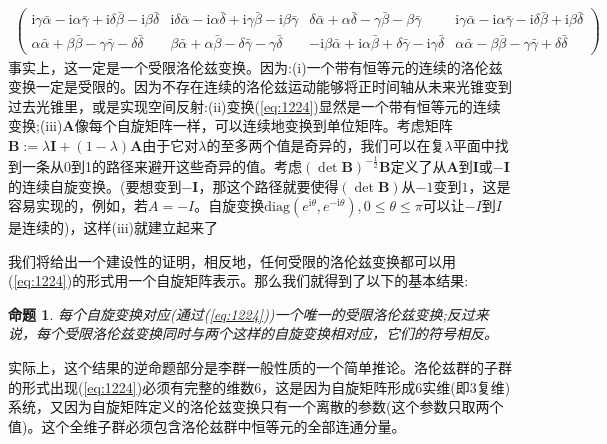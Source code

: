 \documentclass[utf8]{ctexbook}
\numberwithin{equation}{section}
\newtheorem{proposition}{命题}[chapter]
\begin{document}
\begin{gather}
{{\begin{pmatrix}
            \mathrm{i} \gamma  \bar{\alpha }-\mathrm{i} \alpha  \bar{\gamma }+\mathrm{i} \delta  \bar{\beta }-\mathrm{i} \beta \bar{\delta }& \mathrm{i} \delta  \bar{\alpha }-\mathrm{i} \alpha  \bar{\delta }+\mathrm{i} \gamma  \bar{\beta }-\mathrm{i} \beta  \bar{\gamma }&\delta  \bar{\alpha }+\alpha  \bar{\delta }-\gamma  \bar{\beta }-\beta  \bar{\gamma }& \mathrm{i} \gamma  \bar{\alpha }-\mathrm{i}\alpha  \bar{\gamma }-\mathrm{i} \delta  \bar{\beta }+\mathrm{i} \beta  \bar{\delta }\\ 
            \alpha  \bar{\alpha }+\beta  \bar{\beta }-\gamma \bar{\gamma }-\delta  \bar{\delta }& \beta  \bar{\alpha }+\alpha  \bar{\beta }-\delta  \bar{\gamma }-\gamma  \bar{\delta}& -\mathrm{i} \beta  \bar{\alpha }+\mathrm{i} \alpha  \bar{\beta }+ \delta  \bar{\gamma }-\mathrm{i} \gamma  \bar{\delta }& \alpha \bar{\alpha }-\beta  \bar{\beta }-\gamma  \bar{\gamma }+\delta  \bar{\delta }
        \end{pmatrix}}}\label{eq:1226}
\end{gather}
事实上，这一定是一个受限洛伦兹变换。因为:(i)一个带有恒等元的连续的洛伦兹变换一定是受限的。因为不存在连续的洛伦兹运动能够将正时间轴从未来光锥变到过去光锥里，或是实现空间反射:(ii)变换(\ref{eq:1224})显然是一个带有恒等元的连续变换;(iii)$\mathbf{A}$像每个自旋矩阵一样，可以连续地变换到单位矩阵。考虑矩阵$\mathbf{B}:=\lambda \mathbf{I}+(1- \lambda)\mathbf{A}$由于它对$\lambda$的至多两个值是奇异的，我们可以在复$\lambda$平面中找到一条从0到1的路径来避开这些奇异的值。考虑$(\det \mathbf{B})^{-\frac12}\mathbf{B}$定义了从$\mathbf{A}$到$\mathbf{I}$或$-\mathbf{I}$的连续自旋变换。(要想变到$-\mathbf{I}$，那这个路径就要使得$(\det \mathbf{B})$从$-1$变到$1$，这是容易实现的，例如，若$A=-I$。自旋变换$\text{diag}(e^{\mathrm{i}\theta},e^{-\mathrm{i}\theta}),0\leqslant\theta\leqslant\pi $可以让$-I$到$I$是连续的)，这样(iii)就建立起来了

我们将给出一个建设性的证明，相反地，任何受限的洛伦兹变换都可以用(\ref{eq:1224})的形式用一个自旋矩阵表示。那么我们就得到了以下的基本结果:
\begin{proposition}
每个自旋变换对应(通过(\ref{eq:1224}))一个唯一的受限洛伦兹变换;反过来说，每个受限洛伦兹变换同时与两个这样的自旋变换相对应，它们的符号相反。\label{pro:1227}
\end{proposition}

实际上，这个结果的逆命题部分是李群一般性质的一个简单推论。洛伦兹群的子群的形式出现(\ref{eq:1224})必须有完整的维数6，这是因为自旋矩阵形成6实维(即3复维)系统，又因为自旋矩阵定义的洛伦兹变换只有一个离散的参数(这个参数只取两个值)。这个全维子群必须包含洛伦兹群中恒等元的全部连通分量。
\end{document}
